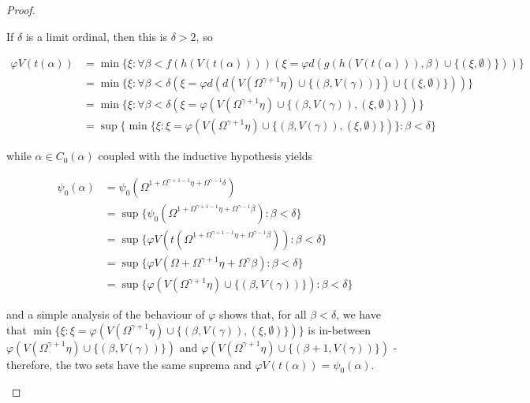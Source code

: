 \documentclass{article}
\theoremstyle{definition}
\theoremstyle{plain}
\theoremstyle{plain}
\theoremstyle{plain}
\theoremstyle{plain}
\theoremstyle{remark}
\theoremstyle{remark}
\theoremstyle{remark}
\theoremstyle{plain}
\theoremstyle{plain}
\begin{document}
\begin{proof}
\begin{enumerate}
\begin{enumerate}
\begin{enumerate}
\begin{enumerate}
                If $\delta$ is a limit ordinal, then this is $\delta > 2$, so

                \begin{equation}
                \begin{split}
                \varphi V(t(\alpha)) & = \min\{\xi: \forall \beta < f(h(V(t(\alpha)))) (\xi=\varphi d(g(h(V(t(\alpha))),\beta) \cup \{(\xi, \emptyset)\}))\} \\ & = \min\{\xi: \forall \beta < \delta (\xi=\varphi d(d(V(\Omega^{\gamma+1} \eta) \cup \{(\beta,V(\gamma))\}) \cup \{(\xi, \emptyset)\}))\} \\ & = \min\{\xi: \forall \beta < \delta (\xi=\varphi (V(\Omega^{\gamma+1} \eta) \cup \{(\beta,V(\gamma)), (\xi, \emptyset)\}))\} \\ & = \sup\{\min\{\xi: \xi=\varphi (V(\Omega^{\gamma+1} \eta) \cup \{(\beta,V(\gamma)), (\xi, \emptyset)\})\}: \beta < \delta\}
                \end{split}
                \end{equation}

                while $\alpha \in C_0(\alpha)$ coupled with the inductive hypothesis yields

                \begin{equation}
                \begin{split}
                \psi_0(\alpha) & = \psi_0(\Omega^{1 + \Omega^{\gamma+1-1} \eta + \Omega^{\gamma-1} \delta}) \\ & = \sup\{\psi_0(\Omega^{1 + \Omega^{\gamma+1-1} \eta + \Omega^{\gamma-1} \beta}): \beta < \delta\} \\ & = \sup\{\varphi V(t(\Omega^{1 + \Omega^{\gamma+1-1} \eta + \Omega^{\gamma-1} \beta})): \beta < \delta\} \\ & = \sup\{\varphi V(\Omega + \Omega^{\gamma+1} \eta + \Omega^\gamma \beta): \beta < \delta\} \\ & = \sup\{\varphi (V(\Omega^{\gamma+1} \eta) \cup \{(\beta, V(\gamma))\}): \beta < \delta\}
                \end{split}
                \end{equation}

                and a simple analysis of the behaviour of $\varphi$ shows that, for all $\beta < \delta$, we have that $\min\{\xi: \xi=\varphi (V(\Omega^{\gamma+1} \eta) \cup \{(\beta,V(\gamma)), (\xi, \emptyset)\})\}$ is in-between $\varphi (V(\Omega^{\gamma+1} \eta) \cup \{(\beta, V(\gamma))\})$ and $\varphi (V(\Omega^{\gamma+1} \eta) \cup \{(\beta+1, V(\gamma))\})$ - therefore, the two sets have the same suprema and $\varphi V(t(\alpha)) = \psi_0(\alpha)$.


\end{enumerate}
\end{enumerate}
\end{enumerate}
\end{enumerate}
\end{proof}
\end{document}
